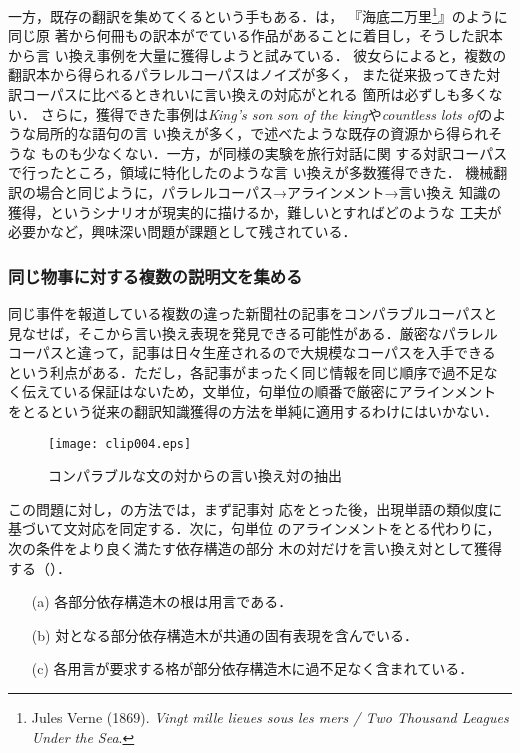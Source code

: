 一方，既存の翻訳を集めてくるという手もある．は，
『海底二万里\footnote{Jules Verne (1869). \emph{Vingt mille lieues
sous les mers / Two Thousand Leagues Under the Sea}.}』のように同じ原
著から何冊もの訳本がでている作品があることに着目し，そうした訳本から言
い換え事例を大量に獲得しようと試みている．
彼女らによると，複数の翻訳本から得られるパラレルコーパスはノイズが多く，
また従来扱ってきた対訳コーパスに比べるときれいに言い換えの対応がとれる
箇所は必ずしも多くない．
さらに，獲得できた事例は\emph{King's son} {\lra} \emph{son of the
king}や\emph{countless} {\lra} \emph{lots of}のような局所的な語句の言
い換えが多く，で述べたような既存の資源から得られそうな
ものも少なくない．一方，が同様の実験を旅行対話に関
する対訳コーパスで行ったところ，領域に特化したのような言
い換えが多数獲得できた．
機械翻訳の場合と同じように，パラレルコーパス→アラインメント→言い換え
知識の獲得，というシナリオが現実的に描けるか，難しいとすればどのような
工夫が必要かなど，興味深い問題が課題として残されている．

\subsubsection{同じ物事に対する複数の説明文を集める}

同じ事件を報道している複数の違った新聞社の記事をコンパラブルコーパスと
見なせば，そこから言い換え表現を発見できる可能性がある．厳密なパラレル
コーパスと違って，記事は日々生産されるので大規模なコーパスを入手できる
という利点がある．ただし，各記事がまったく同じ情報を同じ順序で過不足な
く伝えている保証はないため，文単位，句単位の順番で厳密にアラインメント
をとるという従来の翻訳知識獲得の方法を単純に適用するわけにはいかない．

\begin{figure}[t]
\begin{center}
\leavevmode
\texttt{[image: clip004.eps]}
\caption{コンパラブルな文の対からの言い換え対の抽出\cite{shinyama:03}}
\label{fig:extraction}
\end{center}
\end{figure}

この問題に対し，の方法では，まず記事対
応をとった後，出現単語の類似度に基づいて文対応を同定する．次に，句単位
のアラインメントをとる代わりに，次の条件をより良く満たす依存構造の部分
木の対だけを言い換え対として獲得する（）．
\begin{itemize}
\item[(a)] 各部分依存構造木の根は用言である．
\item[(b)] 対となる部分依存構造木が共通の固有表現を含んでいる．
\item[(c)] 各用言が要求する格が部分依存構造木に過不足なく含まれている．
\end{itemize}

